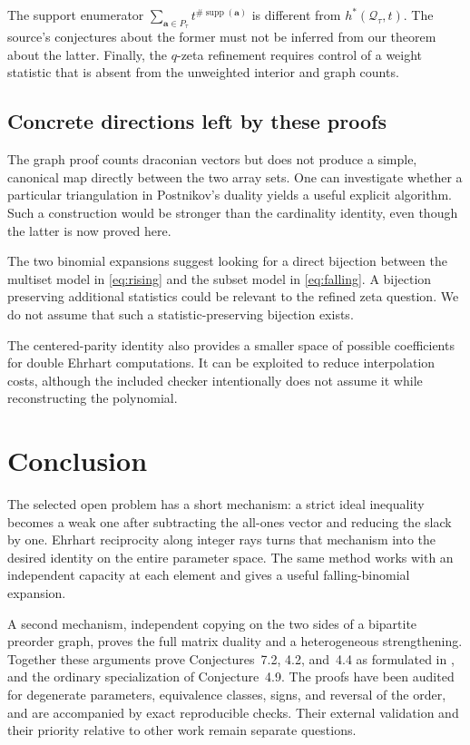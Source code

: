 \documentclass[11pt,letterpaper]{article}
\theoremstyle{definition}
\newcommand{\avec}{\mathbf a}
\newcommand{\QQ}{\mathcal Q}
\DeclareMathOperator{\supp}{supp}
\begin{document}
The support enumerator
$\sum_{\avec\in P_\tau}t^{\#\supp(\avec)}$ is different from
$h^*(\QQ_\tau,t)$. The source's conjectures about the former must not be
inferred from our theorem about the latter. Finally, the $q$-zeta refinement
requires control of a weight statistic that is absent from the unweighted
interior and graph counts.

\subsection{Concrete directions left by these proofs}
The graph proof counts draconian vectors but does not produce a simple,
canonical map directly between the two array sets. One can investigate
whether a particular triangulation in Postnikov's duality yields a useful
explicit algorithm. Such a construction would be stronger than the
cardinality identity, even though the latter is now proved here.

The two binomial expansions suggest looking for a direct bijection between
the multiset model in \eqref{eq:rising} and the subset model in
\eqref{eq:falling}. A bijection preserving additional statistics could be
relevant to the refined zeta question. We do not assume that such a
statistic-preserving bijection exists.

The centered-parity identity also provides a smaller space of possible
coefficients for double Ehrhart computations. It can be exploited to reduce
interpolation costs, although the included checker intentionally does not
assume it while reconstructing the polynomial.

\section{Conclusion}
The selected open problem has a short mechanism: a strict ideal inequality
becomes a weak one after subtracting the all-ones vector and reducing the
slack by one. Ehrhart reciprocity along integer rays turns that mechanism
into the desired identity on the entire parameter space. The same method
works with an independent capacity at each element and gives a useful
falling-binomial expansion.

A second mechanism, independent copying on the two sides of a bipartite
preorder graph, proves the full matrix duality and a heterogeneous
strengthening. Together these arguments prove Conjectures~7.2, 4.2, and~4.4
as formulated in \cite{AC26}, and the ordinary specialization of
Conjecture~4.9. The proofs have been audited for degenerate parameters,
equivalence classes, signs, and reversal of the order, and are accompanied
by exact reproducible checks. Their external validation and their priority
relative to other work remain separate questions.
\end{document}

